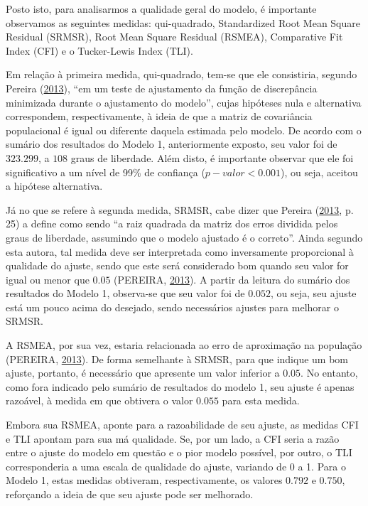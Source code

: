 \documentclass[
  12pt,
]{article}
\begin{document}
Posto isto, para analisarmos a qualidade geral do modelo, é importante
observamos as seguintes medidas: qui-quadrado, Standardized Root Mean
Square Residual (SRMSR), Root Mean Square Residual (RSMEA), Comparative
Fit Index (CFI) e o Tucker-Lewis Index (TLI).

Em relação à primeira medida, qui-quadrado, tem-se que ele consistiria,
segundo Pereira (\protect\hyperlink{ref-pereira2013modelagem}{2013}),
``em um teste de ajustamento da função de discrepância minimizada
durante o ajustamento do modelo'', cujas hipóteses nula e alternativa
correspondem, respectivamente, à ideia de que a matriz de covariância
populacional é igual ou diferente daquela estimada pelo modelo. De
acordo com o sumário dos resultados do Modelo 1, anteriormente exposto,
seu valor foi de \(323.299\), a \(108\) graus de liberdade. Além disto,
é importante observar que ele foi significativo a um nível de 99\% de
confiança (\(p-valor < 0.001\)), ou seja, aceitou a hipótese
alternativa.

Já no que se refere à segunda medida, SRMSR, cabe dizer que Pereira
(\protect\hyperlink{ref-pereira2013modelagem}{2013}, p. 25) a define
como sendo ``a raiz quadrada da matriz dos erros dividida pelos graus de
liberdade, assumindo que o modelo ajustado é o correto''. Ainda segundo
esta autora, tal medida deve ser interpretada como inversamente
proporcional à qualidade do ajuste, sendo que este será considerado bom
quando seu valor for igual ou menor que \(0.05\) (PEREIRA,
\protect\hyperlink{ref-pereira2013modelagem}{2013}). A partir da leitura
do sumário dos resultados do Modelo 1, observa-se que seu valor foi de
\(0.052\), ou seja, seu ajuste está um pouco acima do desejado, sendo
necessários ajustes para melhorar o SRMSR.

A RSMEA, por sua vez, estaria relacionada ao erro de aproximação na
população (PEREIRA, \protect\hyperlink{ref-pereira2013modelagem}{2013}).
De forma semelhante à SRMSR, para que indique um bom ajuste, portanto, é
necessário que apresente um valor inferior a \(0.05\). No entanto, como
fora indicado pelo sumário de resultados do modelo 1, seu ajuste é
apenas razoável, à medida em que obtivera o valor \(0.055\) para esta
medida.

Embora sua RSMEA, aponte para a razoabilidade de seu ajuste, as medidas
CFI e TLI apontam para sua má qualidade. Se, por um lado, a CFI seria a
razão entre o ajuste do modelo em questão e o pior modelo possível, por
outro, o TLI corresponderia a uma escala de qualidade do ajuste,
variando de 0 a 1. Para o Modelo 1, estas medidas obtiveram,
respectivamente, os valores \(0.792\) e \(0.750\), reforçando a ideia de
que seu ajuste pode ser melhorado.
\end{document}
